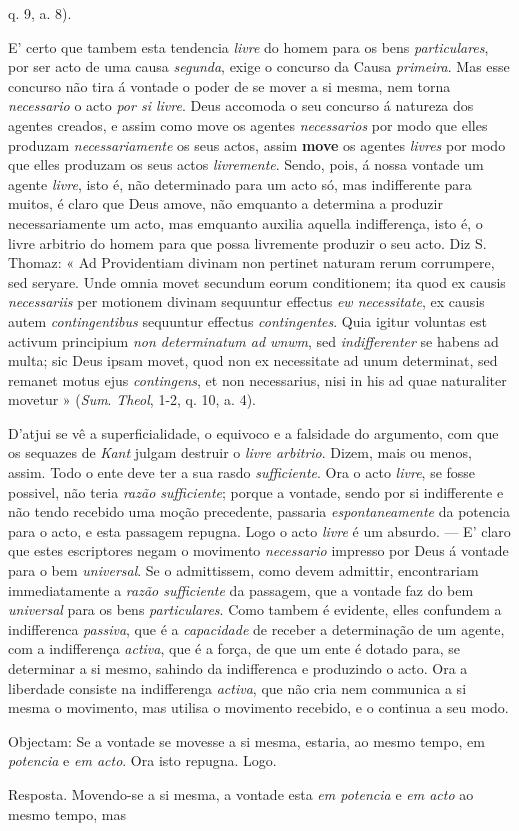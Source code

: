 q. 9, a. 8).\par E' certo que tambem esta tendencia \emph{livre} do homem para os bens \emph{particulares}, por ser acto de uma causa \emph{segunda}, exige o concurso da Causa \emph{primeira}. Mas esse concurso não tira á vontade o poder de se mover a si mesma, nem torna \emph{necessario} o acto \emph{por si livre}. Deus accomoda o seu concurso á natureza dos agentes creados, e assim como move os agentes \emph{necessarios} por modo que elles produzam \emph{necessariamente} os seus actos, assim \textbf{move} os agentes \emph{livres} por modo que elles produzam os seus actos \emph{livremente}. Sendo, pois, á nossa vontade um agente \emph{livre}, isto é, não determinado para um acto só, mas indifferente para muitos, é claro que Deus amove, não emquanto a determina a produzir necessariamente um acto, mas emquanto auxilia aquella indifferença, isto é, o livre arbitrio do homem para que possa livremente produzir o seu acto. Diz S. Thomaz: « Ad Providentiam divinam non pertinet naturam rerum corrumpere, sed seryare. Unde omnia movet secundum eorum conditionem; ita quod ex causis \emph{necessariis} per motionem divinam sequuntur effectus \emph{ew necessitate}, ex causis autem \emph{contingentibus} sequuntur effectus \emph{contingentes}. Quia igitur voluntas est activum principium \emph{non determinatum ad wnwm}, sed \emph{indifferenter} se habens ad multa; sic Deus ipsam movet, quod non ex necessitate ad unum determinat, sed remanet motus ejus \emph{contingens}, et non necessarius, nisi in his ad quae naturaliter movetur » (\emph{Sum}. \emph{Theol}, 1-2, q. 10, a. 4).\par D'atjui se vê a superficialidade, o equivoco e a falsidade do argumento, com que os sequazes de \emph{Kant} julgam destruir o \emph{livre arbitrio}. Dizem, mais ou menos, assim. Todo o ente deve ter a sua rasdo \emph{sufficiente}. Ora o acto \emph{livre}, se fosse possivel, não teria \emph{razão sufficiente}; porque a vontade, sendo por si indifferente e não tendo recebido uma moção precedente, passaria \emph{espontaneamente} da potencia para o acto, e esta passagem repugna. Logo o acto \emph{livre} é um absurdo. --- E' claro que estes escriptores negam o movimento \emph{necessario} impresso por Deus á vontade para o bem \emph{universal}. Se o admittissem, como devem admittir, encontrariam immediatamente a \emph{razão sufficiente} da passagem, que a vontade faz do bem \emph{universal} para os bens \emph{particulares}. Como tambem é evidente, elles confundem a indifferenca \emph{passiva}, que é a \emph{capacidade} de receber a determinação de um agente, com a indifferença \emph{activa}, que é a força, de que um ente é dotado para, se determinar a si mesmo, sahindo da indifferenca e produzindo o acto. Ora a liberdade consiste na indifferenga \emph{activa}, que não cria nem communica a si mesma o movimento, mas utilisa o movimento recebido, e o continua a seu modo.\par Objectam: Se a vontade se movesse a si mesma, estaria, ao mesmo tempo, em \emph{potencia} e \emph{em acto}. Ora isto repugna. Logo.\par Resposta. Movendo-se a si mesma, a vontade esta \emph{em potencia} e \emph{em acto} ao mesmo tempo, mas 